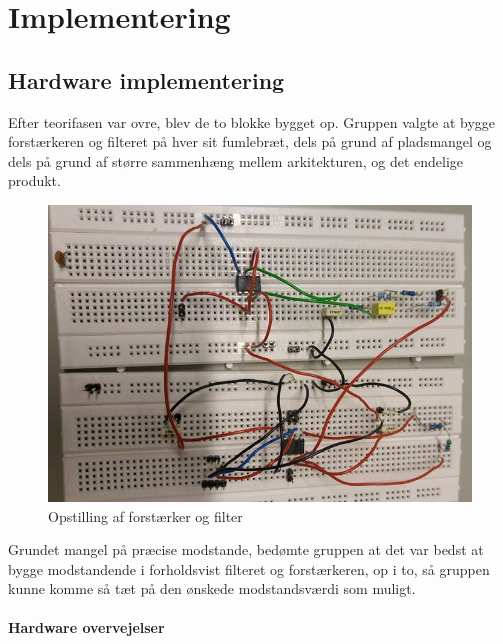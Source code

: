 \chapter{Implementering}

\section{Hardware implementering}\label{Hardware implementering}

Efter teorifasen var ovre, blev de to blokke bygget op. Gruppen valgte at bygge forstærkeren og filteret på hver sit fumlebræt, dels på grund af pladsmangel og dels på grund af større sammenhæng mellem arkitekturen, og det endelige produkt.\\

\begin{figure}[H]
	\centering
	\includegraphics[width=1\textwidth]{Figurer/Hardware/samletopstilling}
	\caption{Opstilling af forstærker og filter}
	\label{Dsamletopbygning}
\end{figure}

Grundet mangel på præcise modstande, bedømte gruppen at det var bedst at bygge modstandende i forholdsvist filteret og forstærkeren, op i to, så gruppen kunne komme så tæt på den ønskede modstandsværdi som muligt. \\

\subsubsection{Hardware overvejelser}

